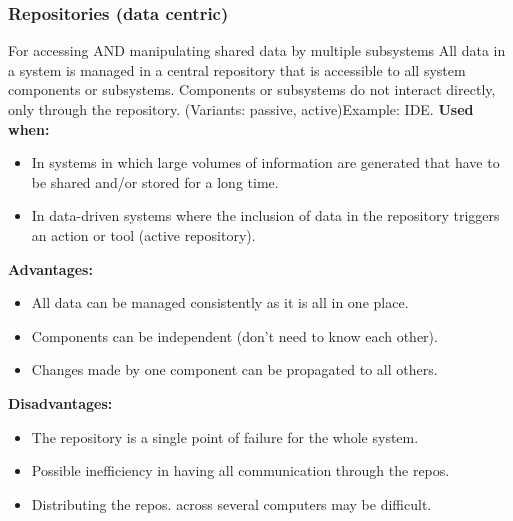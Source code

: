 \documentclass[../ESOF_notes.tex]{subfiles}
\begin{document}
\subsubsection{Repositories (data centric)}
For accessing AND manipulating shared data by multiple subsystems\newline\newline
All data in a system is managed in a central repository that is accessible to all system components or subsystems. Components or subsystems do not interact directly, only through the repository. (Variants: passive, active)\newline Example: IDE. \newline\newline
\textbf{Used when:}
\begin{itemize}
    \item In systems in which large volumes of information are generated that have to be shared and/or stored for a long time.
    \item In data-driven systems where the inclusion of data in the repository triggers an action or tool (active repository).
\end{itemize}
\textbf{Advantages:}
\begin{itemize}
    \item All data can be managed consistently as it is all in one place.
    \item Components can be independent (don’t need to know each other).
    \item Changes made by one component can be propagated to all others.
\end{itemize}
\textbf{Disadvantages:}
\begin{itemize}
    \item The repository is a single point of failure for the whole system.
    \item Possible inefficiency in having all communication through the repos.
    \item Distributing the repos. across several computers may be difficult.
\end{itemize}
\end{document}
